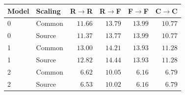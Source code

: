 \begin{tabular}{llrrrr}
\toprule
\rowcolor{Navy!8}
Model & Scaling & R$\to$R & R$\to$F & F$\to$F & C$\to$C \\
\midrule
\rowcolor{Navy!3}
0 & Common & $11.66$ & $13.79$ & $13.99$ & $10.77$ \\
\rowcolor{Navy!3}
0 & Source & $11.37$ & $13.77$ & $13.99$ & $10.77$ \\
\midrule
\rowcolor{Navy!3}
1 & Common & $13.00$ & $14.21$ & $13.93$ & $11.28$ \\
\rowcolor{Navy!3}
1 & Source & $12.82$ & $14.44$ & $13.93$ & $11.28$ \\
\midrule
\rowcolor{Real!7}
2 & Common & $6.62$ & $10.05$ & $6.16$ & $6.79$ \\
\rowcolor{Real!7}
2 & Source & $6.53$ & $10.02$ & $6.16$ & $6.79$ \\
\bottomrule
\end{tabular}
